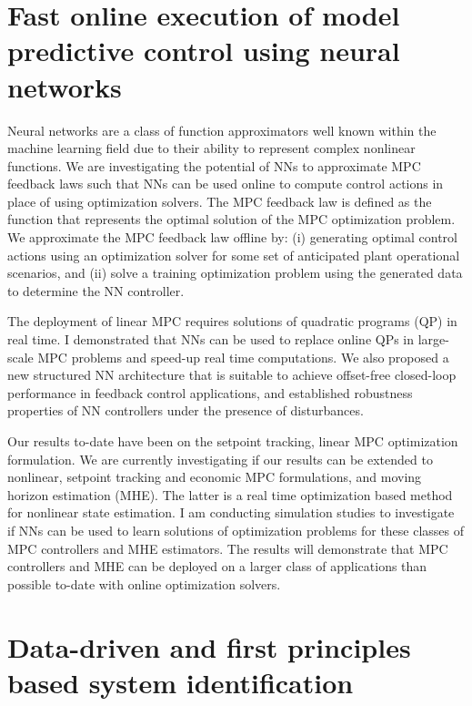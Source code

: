 \documentclass[11pt, a4paper]{article} %
\begin{document}
\section*{Fast online execution of model predictive control using neural networks}

Neural networks are a class of function approximators well known within the machine learning field due to their ability to represent complex nonlinear functions. We are investigating the potential of NNs to approximate MPC feedback laws such that NNs can be used online to compute control actions in place of using optimization solvers. The MPC feedback law is defined as the function that represents the optimal solution of the MPC optimization problem. We approximate the MPC feedback law offline by: (i) generating optimal control actions using an optimization solver for some set of anticipated plant operational scenarios, and (ii) solve a training optimization problem using the generated data to determine the NN controller.

The deployment of linear MPC requires solutions of quadratic programs (QP) in real time. I demonstrated \cite{kumar:rawlings:wright:2021} that NNs can be used to replace online QPs in large-scale MPC problems and speed-up real time computations. We also proposed a new structured NN architecture that is suitable to achieve offset-free closed-loop performance in feedback control applications, and established robustness properties of NN controllers under the presence of disturbances.
 
Our results to-date have been on the setpoint tracking, linear MPC optimization formulation. We are currently investigating if our results can be extended to nonlinear, setpoint tracking and economic MPC formulations, and moving horizon estimation (MHE). The latter is a real time optimization based method for nonlinear state estimation. I am conducting simulation studies to investigate if NNs can be used to learn solutions of optimization problems for these classes of MPC controllers and MHE  estimators. The results will demonstrate that MPC controllers and MHE can be deployed on a larger class of applications than possible to-date with online optimization solvers.

\section*{Data-driven and first principles based system identification}
\end{document}

